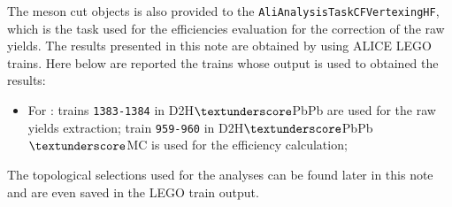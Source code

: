 The \Dstar meson cut objects is also provided to the \texttt{AliAnalysisTaskCFVertexingHF}, which is the task used for the efficiencies evaluation for the correction of the raw yields. The results presented in this note are obtained by using ALICE LEGO trains. Here below are reported the trains whose output is used to obtained the results:
\begin{itemize}
	\item For \Dstar: trains \texttt{1383-1384} in D2H$\textunderscore$PbPb are used for the raw yields extraction; train \texttt{959-960} in D2H$\textunderscore$PbPb$\textunderscore$MC is used for the efficiency calculation;
\end{itemize}

The topological selections used for the analyses can be found later in this note and are even saved in the LEGO train output.
\newpage
